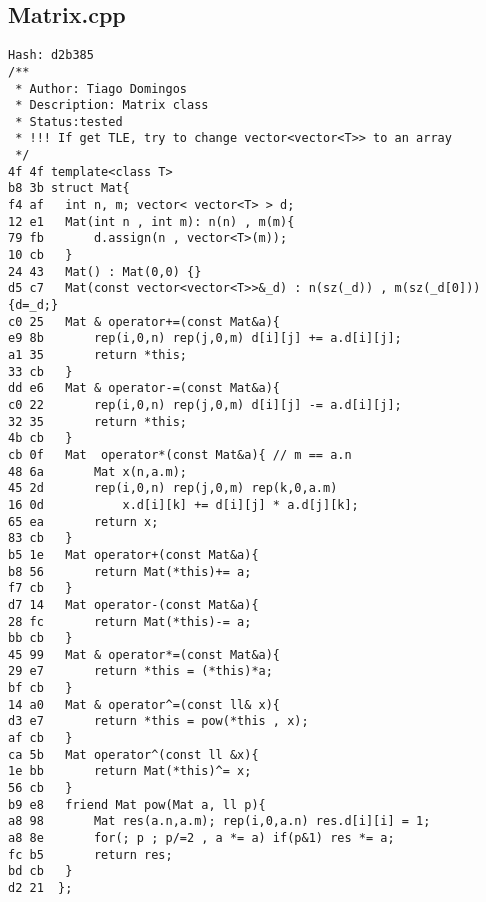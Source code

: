 \documentclass[11pt, a4paper, twoside]{article}
\begin{document}
\subsection{Matrix.cpp}
\begin{lstlisting}
Hash: d2b385
/**
 * Author: Tiago Domingos
 * Description: Matrix class
 * Status:tested
 * !!! If get TLE, try to change vector<vector<T>> to an array
 */
4f 4f template<class T>
b8 3b struct Mat{
f4 af 	int n, m; vector< vector<T> > d;
12 e1 	Mat(int n , int m): n(n) , m(m){
79 fb 		d.assign(n , vector<T>(m));
10 cb 	}
24 43 	Mat() : Mat(0,0) {}
d5 c7 	Mat(const vector<vector<T>>&_d) : n(sz(_d)) , m(sz(_d[0])) {d=_d;}
c0 25 	Mat & operator+=(const Mat&a){
e9 8b 		rep(i,0,n) rep(j,0,m) d[i][j] += a.d[i][j];
a1 35 		return *this;
33 cb 	}
dd e6 	Mat & operator-=(const Mat&a){
c0 22 		rep(i,0,n) rep(j,0,m) d[i][j] -= a.d[i][j];
32 35 		return *this;
4b cb 	}
cb 0f 	Mat  operator*(const Mat&a){ // m == a.n
48 6a 		Mat x(n,a.m);
45 2d 		rep(i,0,n) rep(j,0,m) rep(k,0,a.m)
16 0d 			x.d[i][k] += d[i][j] * a.d[j][k];
65 ea 		return x;
83 cb 	}
b5 1e 	Mat operator+(const Mat&a){
b8 56 		return Mat(*this)+= a;
f7 cb 	}
d7 14 	Mat operator-(const Mat&a){
28 fc 		return Mat(*this)-= a;
bb cb 	}
45 99 	Mat & operator*=(const Mat&a){
29 e7 		return *this = (*this)*a;
bf cb 	}
14 a0 	Mat & operator^=(const ll& x){
d3 e7 		return *this = pow(*this , x);
af cb 	}
ca 5b 	Mat operator^(const ll &x){
1e bb 		return Mat(*this)^= x;
56 cb 	}
b9 e8 	friend Mat pow(Mat a, ll p){
a8 98 		Mat res(a.n,a.m); rep(i,0,a.n) res.d[i][i] = 1;
a8 8e 		for(; p ; p/=2 , a *= a) if(p&1) res *= a;
fc b5 		return res;
bd cb 	}
d2 21  };
\end{lstlisting}
\end{document}
